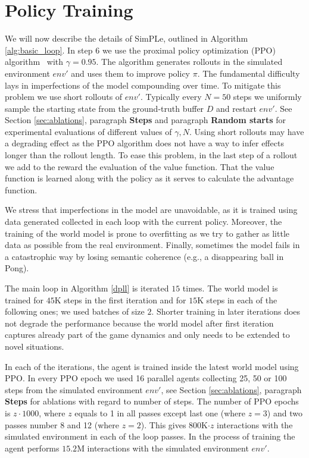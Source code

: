 \section{Policy Training} \label{sec:policy_training}
We will now describe the details of SimPLe, outlined in Algorithm \ref{alg:basic_loop}.  In step 6 we use the proximal policy optimization (PPO) algorithm~\cite{ppo} with $\gamma=0.95$. The algorithm generates rollouts in the simulated environment $env'$ and uses them to improve policy $\pi$. The fundamental difficulty lays in imperfections of the model compounding over time. To mitigate this problem we use short rollouts of $env'$. Typically every $N=50$ steps we uniformly sample the starting state from the ground-truth buffer $D$ and restart $env'$. See Section \ref{sec:ablations}, paragraph {\bf Steps} and paragraph {\bf Random starts} for experimental evaluations of different values of $\gamma, N$. Using short rollouts may have a degrading effect as the PPO algorithm does not have a way to infer effects longer than the rollout length. To ease this problem, in the last step of a rollout we add to the reward the evaluation of the value function. That the value function is learned along with the policy as it serves to calculate the advantage function.

We stress that imperfections in the model are unavoidable, as it is trained using data generated collected in each loop with the current policy. Moreover, the training of the world model is prone to overfitting as we try to gather as little data as possible from the real environment. Finally, sometimes the model fails in a catastrophic way by losing semantic coherence (e.g., a disappearing ball in Pong).

The main loop in Algorithm \ref{dpll} is iterated $15$ times. The world model is trained for $45$K steps in the first iteration and for $15$K steps in each of the following ones; we used batches of size $2$. Shorter training in later iterations does not degrade the performance because the world model after first iteration captures already part of the game dynamics and only needs to be extended to novel situations.

In each of the iterations, the agent is trained inside the latest world model using PPO. In every PPO epoch we used 16 parallel agents collecting 25, 50 or 100 steps from the simulated environment $env'$, see Section \ref{sec:ablations}, paragraph {\bf Steps} for ablations with regard to number of steps. The number of PPO epochs is $z\cdot 1000$, where $z$ equals to 1 in all passes except last one (where $z = 3$) and two passes number 8 and 12 (where $z = 2$). This gives $800$K$\cdot z$ interactions with the simulated environment in each of the loop passes. In the process of training the agent performs  $15.2$M interactions with the simulated environment $env'$.
